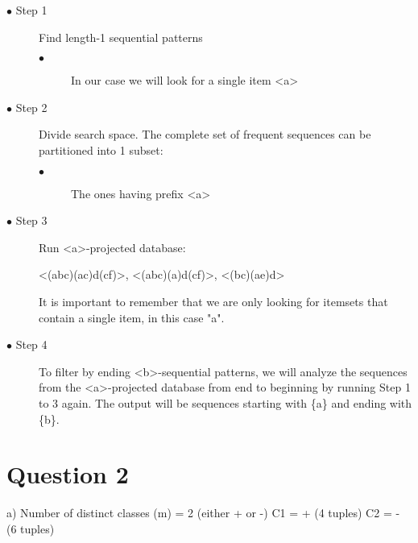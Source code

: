 \documentclass[a4paper]{article}
\begin{document}
\begin{description}
    \item[$\bullet$ Step 1] Find length-1 sequential patterns
    \begin{outline}
      \begin{description}
        \item[$\bullet$] In our case we will look for a single item \textless a\textgreater
      \end{description}
    \end{outline}

    \item[$\bullet$ Step 2] Divide search space. The complete set of frequent sequences can be partitioned into 1 subset:
    \begin{outline}
      \begin{description}
        \item[$\bullet$] The ones having prefix \textless a\textgreater
      \end{description}
    \end{outline}

    \item[$\bullet$ Step 3] Run \textless a\textgreater-projected database:

    \textless (abc)(ac)d(cf)\textgreater,
    \textless (abc)(a)d(cf)\textgreater,
    \textless (bc)(ae)d\textgreater

    It is important to remember that we are only looking for itemsets that contain a single item, in this case "a".

    \item[$\bullet$ Step 4] To filter by ending \textless b\textgreater-sequential patterns, we will analyze the sequences from the \textless a\textgreater-projected database from end to beginning by running Step 1 to 3 again. The output will be sequences starting with \{a\} and ending with \{b\}.

\end{description}

\maketitle

\section*{Question 2}
a)
\newline
Number of distinct classes (m) = 2 (either + or -)
\newline
C1 = + (4 tuples)
\newline
C2 = - (6 tuples)
\end{document}
